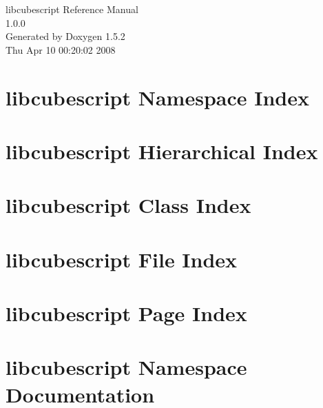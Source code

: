 \documentclass[a4paper]{book}
\begin{document}
\begin{titlepage}
\vspace*{7cm}
\begin{center}
{\Large libcubescript Reference Manual\\[1ex]\large 1.0.0 }\\
\vspace*{1cm}
{\large Generated by Doxygen 1.5.2}\\
\vspace*{0.5cm}
{\small Thu Apr 10 00:20:02 2008}\\
\end{center}
\end{titlepage}
\clearemptydoublepage
{}
\tableofcontents
\clearemptydoublepage
{}
\chapter{libcubescript Namespace Index}

\chapter{libcubescript Hierarchical Index}

\chapter{libcubescript Class Index}

\chapter{libcubescript File Index}

\chapter{libcubescript Page Index}

\chapter{libcubescript Namespace Documentation}



\end{document}
